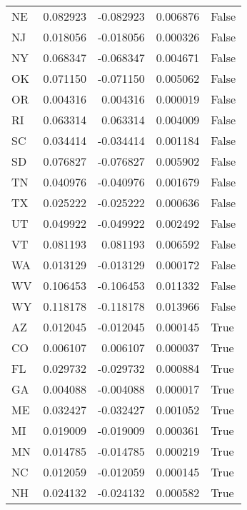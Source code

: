 \begin{table}
\begin{tabular}{lrrrl}
      NE &   0.082923 & -0.082923 &       0.006876 &         False \\
      NJ &   0.018056 & -0.018056 &       0.000326 &         False \\
      NY &   0.068347 & -0.068347 &       0.004671 &         False \\
      OK &   0.071150 & -0.071150 &       0.005062 &         False \\
      OR &   0.004316 &  0.004316 &       0.000019 &         False \\
      RI &   0.063314 &  0.063314 &       0.004009 &         False \\
      SC &   0.034414 & -0.034414 &       0.001184 &         False \\
      SD &   0.076827 & -0.076827 &       0.005902 &         False \\
      TN &   0.040976 & -0.040976 &       0.001679 &         False \\
      TX &   0.025222 & -0.025222 &       0.000636 &         False \\
      UT &   0.049922 & -0.049922 &       0.002492 &         False \\
      VT &   0.081193 &  0.081193 &       0.006592 &         False \\
      WA &   0.013129 & -0.013129 &       0.000172 &         False \\
      WV &   0.106453 & -0.106453 &       0.011332 &         False \\
      WY &   0.118178 & -0.118178 &       0.013966 &         False \\
      AZ &   0.012045 & -0.012045 &       0.000145 &          True \\
      CO &   0.006107 &  0.006107 &       0.000037 &          True \\
      FL &   0.029732 & -0.029732 &       0.000884 &          True \\
      GA &   0.004088 & -0.004088 &       0.000017 &          True \\
      ME &   0.032427 & -0.032427 &       0.001052 &          True \\
      MI &   0.019009 & -0.019009 &       0.000361 &          True \\
      MN &   0.014785 & -0.014785 &       0.000219 &          True \\
      NC &   0.012059 & -0.012059 &       0.000145 &          True \\
      NH &   0.024132 & -0.024132 &       0.000582 &          True \\

\end{tabular}
\end{table}
